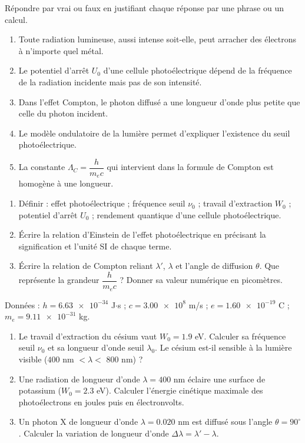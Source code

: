 \documentclass[11pt]{article}
\providecommand{\degree}{^{\circ}}
\begin{document}
\begin{exercice}
Répondre par vrai ou faux en justifiant chaque réponse par une phrase ou un calcul.
\begin{enumerate}
\item Toute radiation lumineuse, aussi intense soit-elle, peut arracher des électrons à n'importe quel métal.
\item Le potentiel d'arrêt $U_0$ d'une cellule photoélectrique dépend de la fréquence de la radiation incidente mais pas de son intensité.
\item Dans l'effet Compton, le photon diffusé a une longueur d'onde plus petite que celle du photon incident.
\item Le modèle ondulatoire de la lumière permet d'expliquer l'existence du seuil photoélectrique.
\item La constante $\Lambda_C = \dfrac{h}{m_e c}$ qui intervient dans la formule de Compton est homogène à une longueur.
\end{enumerate}
\end{exercice}

\begin{exercice}
\begin{enumerate}
\item Définir : effet photoélectrique ; fréquence seuil $\nu_0$ ; travail d'extraction $W_0$ ; potentiel d'arrêt $U_0$ ; rendement quantique d'une cellule photoélectrique.
\item Écrire la relation d'Einstein de l'effet photoélectrique en précisant la signification et l'unité SI de chaque terme.
\item Écrire la relation de Compton reliant $\lambda'$, $\lambda$ et l'angle de diffusion $\theta$. Que représente la grandeur $\dfrac{h}{m_e c}$ ? Donner sa valeur numérique en picomètres.
\end{enumerate}
\end{exercice}

\begin{exercice}
Données : $h = \num{6,63e-34}$ J$\cdot$s ; $c = \num{3,00e8}$ m/s ; $e = \num{1,60e-19}$ C ; $m_e = \num{9,11e-31}$ kg.
\begin{enumerate}
\item Le travail d'extraction du césium vaut $W_0 = \num{1,9}$ eV. Calculer sa fréquence seuil $\nu_0$ et sa longueur d'onde seuil $\lambda_0$. Le césium est-il sensible à la lumière visible ($\num{400}$ nm $< \lambda <$ $\num{800}$ nm) ?
\item Une radiation de longueur d'onde $\lambda = \num{400}$ nm éclaire une surface de potassium ($W_0 = \num{2,3}$ eV). Calculer l'énergie cinétique maximale des photoélectrons en joules puis en électronvolts.
\item Un photon X de longueur d'onde $\lambda = \num{0,020}$ nm est diffusé sous l'angle $\theta = 90\degree$. Calculer la variation de longueur d'onde $\Delta\lambda = \lambda' - \lambda$.
\end{enumerate}
\end{exercice}
\end{document}
